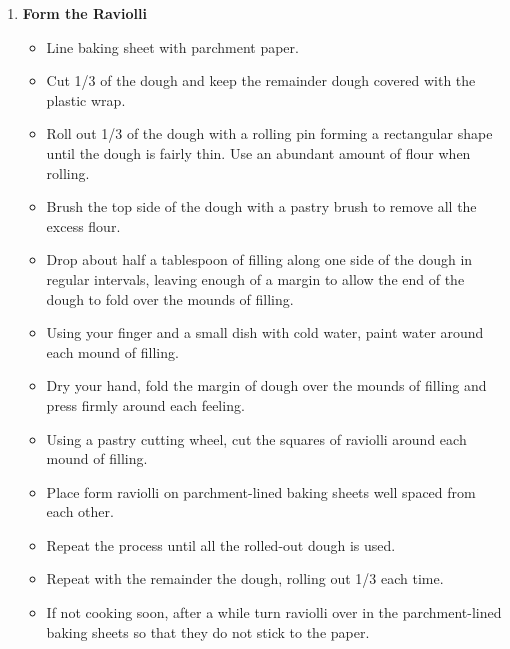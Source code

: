 \documentclass[11pt,letterpaper]{article}
\begin{document}
\begin{description}
\begin{enumerate}
	\item {\bf Form the Raviolli}
	\begin{itemize}
	\item Line baking sheet with parchment paper.
	\item Cut 1/3 of the dough and keep the remainder dough covered with the plastic wrap.
	\item Roll out 1/3 of the dough with a rolling pin forming a rectangular shape until the dough is fairly thin. Use an abundant amount of flour when rolling.
	\item Brush the top side of the dough with a pastry brush to remove all the excess flour. 
	\item Drop about half a tablespoon of filling along one side of the dough in regular intervals, leaving enough of a margin to allow the end of the dough to fold over the mounds of filling.
	\item Using your finger and a small dish with cold water, paint water around each mound of filling.
	\item Dry your hand, fold the margin of dough over the mounds of filling and press firmly around each feeling.
	\item Using a pastry cutting wheel, cut the squares of raviolli around each mound of filling.
	\item Place form raviolli on parchment-lined baking sheets well spaced from each other.
	\item Repeat the process until all the rolled-out dough is used.
	\item Repeat with the remainder the dough, rolling out 1/3 each time.
	\item If not cooking soon, after a while turn raviolli over in the parchment-lined baking sheets so that they do not stick to the paper.
	\end{itemize}


\end{enumerate}
\end{description}
\end{document}
